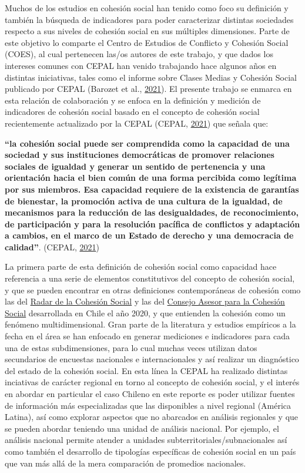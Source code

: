 \documentclass[
  12pt,
]{book}
\begin{document}
Muchos de los estudios en cohesión social han tenido como foco su definición y también la búsqueda de indicadores para poder caracterizar distintas sociedades respecto a sus niveles de cohesión social en sus múltiples dimensiones. Parte de este objetivo lo comparte el Centro de Estudios de Conflicto y Cohesión Social (COES), al cual pertenecen las/os autores de este trabajo, y que dados los intereses comunes con CEPAL han venido trabajando hace algunos años en distintas iniciativas, tales como el informe sobre Clases Medias y Cohesión Social publicado por CEPAL (Barozet et al., \protect\hyperlink{ref-barozet_clases_2021}{2021}). El presente trabajo se enmarca en esta relación de colaboración y se enfoca en la definición y medición de indicadores de cohesión social basado en el concepto de cohesión social recientemente actualizado por la CEPAL (CEPAL, \protect\hyperlink{ref-cepal_cohesion_2021}{2021}) que señala que:

\textbf{``la cohesión social puede ser comprendida como la capacidad de una sociedad y sus instituciones democráticas de promover relaciones sociales de igualdad y generar un sentido de pertenencia y una orientación hacia el bien común de una forma percibida como legítima por sus miembros. Esa capacidad requiere de la existencia de garantías de bienestar, la promoción activa de una cultura de la igualdad, de mecanismos para la reducción de las desigualdades, de reconocimiento, de participación y para la resolución pacífica de conflictos y adaptación a cambios, en el marco de un Estado de derecho y una democracia de calidad''}. (CEPAL, \protect\hyperlink{ref-cepal_cohesion_2021}{2021})

La primera parte de esta definición de cohesión social como capacidad hace referencia a una serie de elementos constitutivos del concepto de cohesión social, y que se pueden encontrar en otras definiciones contemporáneas de cohesión como las del \href{https://www.bertelsmann-stiftung.de/en/publications/publication/did/social-cohesion-radar/}{Radar de la Cohesión Social} y las del \href{https://www.desarrollosocialyfamilia.gob.cl/storage/docs/Informe_Final_Consejo_Cohesion_Social.pdf}{Consejo Asesor para la Cohesión Social} desarrollada en Chile el año 2020, y que entienden la cohesión como un fenómeno multidimensional. Gran parte de la literatura y estudios empíricos a la fecha en el área se han enfocado en generar mediciones e indicadores para cada una de estas subdimensiones, para lo cual muchas veces utilizan datos secundarios de encuestas nacionales e internacionales y así realizar un diagnóstico del estado de la cohesión social. En esta línea la CEPAL ha realizado distintas inciativas de carácter regional en torno al concepto de cohesión social, y el interés en abordar en particular el caso Chileno en este reporte es poder utilizar fuentes de información más especializadas que las disponibles a nivel regional (América Latina), así como explorar aspectos que no abarcados en análisis regionales y que se pueden abordar teniendo una unidad de análisis nacional. Por ejemplo, el análisis nacional permite atender a unidades subterritoriales/subnacionales así como también el desarrollo de tipologías específicas de cohesión social en un país que van más allá de la mera comparación de promedios nacionales.
\end{document}
